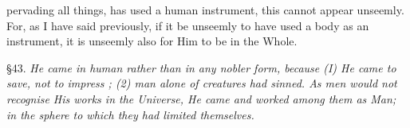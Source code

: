 pervading all things, has used a human instrument, this cannot appear unseemly. For, as I have said previously, if it be unseemly to have used a body as an instrument, it is unseemly also for Him to be in the Whole.


§43. \emph{He came in human rather than in any nobler form, because (I) He came to save, not to impress ; (2) man alone of creatures had sinned. As men would not recognise His works in the Universe, He came and worked among them as Man; in the sphere to which they had limited themselves.}

